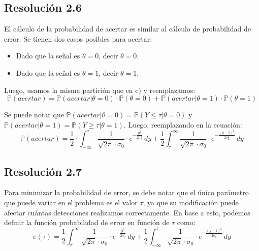 \documentclass[
  11pt,
  letterpaper,
   addpoints,
  answers
  ]{exam}
\begin{document}
\begin{questions}
\begin{solution}
  \subsection*{Resolución 2.6}
  
  El cálculo de la probabilidad de acertar es similar al cálculo de probabilidad de error. Se tienen dos casos posibles para acertar:
  \begin{itemize}
  \item Dado que la señal es $\theta = 0$, decir $\theta = 0$.
  \item Dado que la señal es $\theta = 1$, decir $\theta = 1$.
  \end{itemize}
  
  Luego, usamos la misma partición que en c) y reemplazamos:
  \begin{equation}
  \mathbb{P}(acertar) = \mathbb{P}(acertar|\theta = 0) \cdot \mathbb{P}(\theta = 0) + \mathbb{P}(acertar|\theta = 1) \cdot \mathbb{P}(\theta = 1)
  \end{equation}
  
  Se puede notar que $\mathbb{P}(acertar|\theta = 0) = \mathbb{P}(Y \leq \tau | \theta = 0)$ y $\mathbb{P}(acertar|\theta = 1) = \mathbb{P}(Y \geq \tau | \theta = 1)$. Luego, reemplazando en la ecuación:
  \begin{equation}
  \mathbb{P}(acertar) = \frac{1}{2} \cdot \int_{-\infty}^{\tau} \frac{1}{\sqrt{2\pi} \cdot \sigma_0} \cdot e^{-\frac{y^2}{2\sigma_0^2}} \, dy + \frac{1}{2} \int_{\tau}^{\infty} \frac{1}{\sqrt{2\pi} \cdot \sigma_0} \cdot e^{-\frac{(y-1)^2}{2\sigma_0^2}} \, dy
  \end{equation}

  \subsection*{Resolución 2.7}
  
  Para minimizar la probabilidad de error, se debe notar que el único parámetro que puede variar en el problema es el valor $\tau$, ya que su modificación puede afectar cuántas detecciones realizamos correctamente. En base a esto, podemos definir la función probabilidad de error en función de $\tau$ como:
  \begin{equation}
  e(\tau) = \frac{1}{2} \int_{\tau}^{\infty} \frac{1}{\sqrt{2\pi} \cdot \sigma_0} \cdot e^{-\frac{y^2}{2\sigma_0^2}} \, dy + \frac{1}{2} \int_{-\infty}^{\tau} \frac{1}{\sqrt{2\pi} \cdot \sigma_0} \cdot e^{-\frac{(y-1)^2}{2\sigma_0^2}} \, dy
  \end{equation}
  

\end{solution}
\end{questions}
\end{document}
